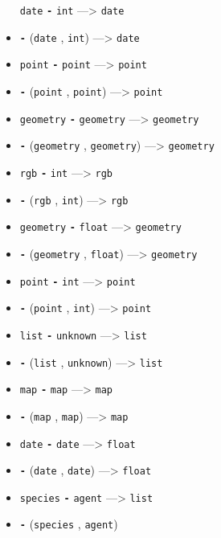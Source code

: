 \documentclass[]{book}
\theoremstyle{definition}
\theoremstyle{definition}
\theoremstyle{definition}
\theoremstyle{remark}
\begin{document}
\begin{itemize}
  \texttt{date} \textbf{\texttt{-}} \texttt{int} ---\textgreater{}
  \texttt{date}
\item
  \textbf{\texttt{-}} (\texttt{date} , \texttt{int}) ---\textgreater{}
  \texttt{date}
\item
  \texttt{point} \textbf{\texttt{-}} \texttt{point} ---\textgreater{}
  \texttt{point}
\item
  \textbf{\texttt{-}} (\texttt{point} , \texttt{point})
  ---\textgreater{} \texttt{point}
\item
  \texttt{geometry} \textbf{\texttt{-}} \texttt{geometry}
  ---\textgreater{} \texttt{geometry}
\item
  \textbf{\texttt{-}} (\texttt{geometry} , \texttt{geometry})
  ---\textgreater{} \texttt{geometry}
\item
  \texttt{rgb} \textbf{\texttt{-}} \texttt{int} ---\textgreater{}
  \texttt{rgb}
\item
  \textbf{\texttt{-}} (\texttt{rgb} , \texttt{int}) ---\textgreater{}
  \texttt{rgb}
\item
  \texttt{geometry} \textbf{\texttt{-}} \texttt{float} ---\textgreater{}
  \texttt{geometry}
\item
  \textbf{\texttt{-}} (\texttt{geometry} , \texttt{float})
  ---\textgreater{} \texttt{geometry}
\item
  \texttt{point} \textbf{\texttt{-}} \texttt{int} ---\textgreater{}
  \texttt{point}
\item
  \textbf{\texttt{-}} (\texttt{point} , \texttt{int}) ---\textgreater{}
  \texttt{point}
\item
  \texttt{list} \textbf{\texttt{-}} \texttt{unknown} ---\textgreater{}
  \texttt{list}
\item
  \textbf{\texttt{-}} (\texttt{list} , \texttt{unknown})
  ---\textgreater{} \texttt{list}
\item
  \texttt{map} \textbf{\texttt{-}} \texttt{map} ---\textgreater{}
  \texttt{map}
\item
  \textbf{\texttt{-}} (\texttt{map} , \texttt{map}) ---\textgreater{}
  \texttt{map}
\item
  \texttt{date} \textbf{\texttt{-}} \texttt{date} ---\textgreater{}
  \texttt{float}
\item
  \textbf{\texttt{-}} (\texttt{date} , \texttt{date}) ---\textgreater{}
  \texttt{float}
\item
  \texttt{species} \textbf{\texttt{-}} \texttt{agent} ---\textgreater{}
  \texttt{list}
\item
  \textbf{\texttt{-}} (\texttt{species} , \texttt{agent})

\end{itemize}
\end{document}
